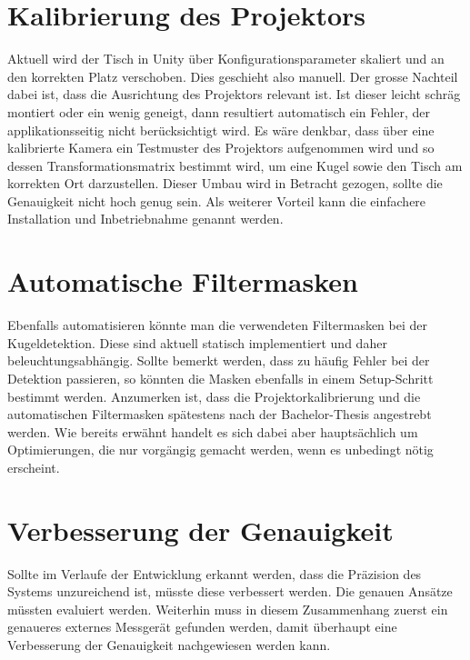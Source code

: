 \section{Kalibrierung des Projektors}
Aktuell wird der Tisch in Unity über Konfigurationsparameter skaliert und an den korrekten Platz verschoben. Dies
geschieht also manuell. Der grosse Nachteil dabei ist, dass die Ausrichtung des Projektors relevant ist. Ist dieser leicht
schräg montiert oder ein wenig geneigt, dann resultiert automatisch ein Fehler, der applikationsseitig nicht berücksichtigt
wird. Es wäre denkbar, dass über eine kalibrierte Kamera ein Testmuster des Projektors aufgenommen wird und so dessen
Transformationsmatrix bestimmt wird, um eine Kugel sowie den Tisch am korrekten Ort darzustellen. Dieser Umbau wird in
Betracht gezogen, sollte die Genauigkeit nicht hoch genug sein. Als weiterer Vorteil kann die einfachere Installation
und Inbetriebnahme genannt werden.

\section{Automatische Filtermasken}
Ebenfalls automatisieren könnte man die verwendeten Filtermasken bei der Kugeldetektion. Diese sind aktuell statisch
implementiert und daher beleuchtungsabhängig. Sollte bemerkt werden, dass zu häufig Fehler bei der Detektion passieren,
so könnten die Masken ebenfalls in einem Setup-Schritt bestimmt werden. Anzumerken ist, dass die Projektorkalibrierung
und die automatischen Filtermasken spätestens nach der Bachelor-Thesis angestrebt werden. Wie bereits erwähnt handelt
es sich dabei aber hauptsächlich um Optimierungen, die nur vorgängig gemacht werden, wenn es unbedingt nötig erscheint.

\section{Verbesserung der Genauigkeit}
Sollte im Verlaufe der Entwicklung erkannt werden, dass die Präzision des Systems unzureichend
ist, müsste diese verbessert werden. Die genauen Ansätze müssten evaluiert werden.
Weiterhin muss in diesem Zusammenhang zuerst ein genaueres
externes Messgerät gefunden werden, damit überhaupt eine Verbesserung der Genauigkeit nachgewiesen werden kann.

